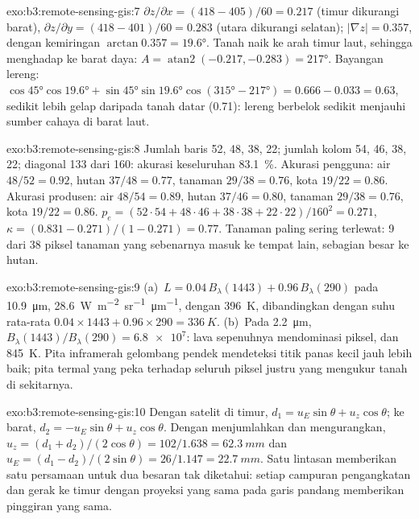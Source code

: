 \begin{solution}{exo:b3:remote-sensing-gis:7}
$\partial z/\partial x = (418 - 405)/60 = 0.217$ (timur dikurangi barat),
$\partial z/\partial y = (418 - 401)/60 = 0.283$ (utara dikurangi selatan);
$|\nabla z| = 0.357$, dengan kemiringan $\arctan 0.357 = \ang{19.6}$. Tanah
naik ke arah timur laut, sehingga menghadap ke barat daya: $A =
\operatorname{atan2}(-0.217, -0.283) = \ang{217}$. Bayangan lereng: $\cos\ang{45}
\cos\ang{19.6} + \sin\ang{45}\sin\ang{19.6}\cos(\ang{315} - \ang{217}) =
0.666 - 0.033 = 0.63$, sedikit lebih gelap daripada tanah datar (0.71): lereng
berbelok sedikit menjauhi sumber cahaya di barat laut.
\end{solution}

\begin{solution}{exo:b3:remote-sensing-gis:8}
Jumlah baris 52, 48, 38, 22; jumlah kolom 54, 46, 38, 22; diagonal 133 dari
160: akurasi keseluruhan \qty{83.1}{\percent}. Akurasi pengguna: air
$48/52 = 0.92$, hutan $37/48 = 0.77$, tanaman $29/38 = 0.76$, kota
$19/22 = 0.86$. Akurasi produsen: air $48/54 = 0.89$, hutan $37/46 = 0.80$,
tanaman $29/38 = 0.76$, kota $19/22 = 0.86$. $p_e = (52\cdot54 + 48\cdot46 +
38\cdot38 + 22\cdot22)/160^2 = 0.271$, $\kappa = (0.831 - 0.271)/(1 -
0.271) = 0.77$. Tanaman paling sering terlewat: 9 dari 38 piksel tanaman yang sebenarnya
masuk ke tempat lain, sebagian besar ke hutan.
\end{solution}

\begin{solution}{exo:b3:remote-sensing-gis:9}
(a)~$L = 0.04\,B_\lambda(1443) + 0.96\,B_\lambda(290)$ pada
\qty{10.9}{\micro\metre}, \qty{28.6}{W.m^{-2}.sr^{-1}.\micro\metre^{-1}},
dengan  \qty{396}{K}, dibandingkan dengan suhu rata-rata
$0.04\times1443 + 0.96\times290 = \qty{336}{K}$. (b)~Pada
\qty{2.2}{\micro\metre}, $B_\lambda(1443)/B_\lambda(290) = \num{6.8e7}$:
lava sepenuhnya mendominasi piksel, dan 
\qty{845}{K}. Pita inframerah gelombang pendek mendeteksi titik panas kecil jauh
lebih baik; pita termal yang peka terhadap seluruh piksel justru
yang mengukur tanah di sekitarnya.
\end{solution}

\begin{solution}{exo:b3:remote-sensing-gis:10}
Dengan satelit di timur, $d_1 = u_E\sin\theta + u_z\cos\theta$; ke
barat, $d_2 = -u_E\sin\theta + u_z\cos\theta$. Dengan menjumlahkan dan mengurangkan,
$u_z = (d_1 + d_2)/(2\cos\theta) = 102/1.638 = \qty{62.3}{mm}$ dan $u_E =
(d_1 - d_2)/(2\sin\theta) = 26/1.147 = \qty{22.7}{mm}$. Satu lintasan memberikan satu
persamaan untuk dua besaran tak diketahui: setiap campuran pengangkatan dan gerak ke timur dengan
proyeksi yang sama pada garis pandang memberikan pinggiran yang sama.
\end{solution}

